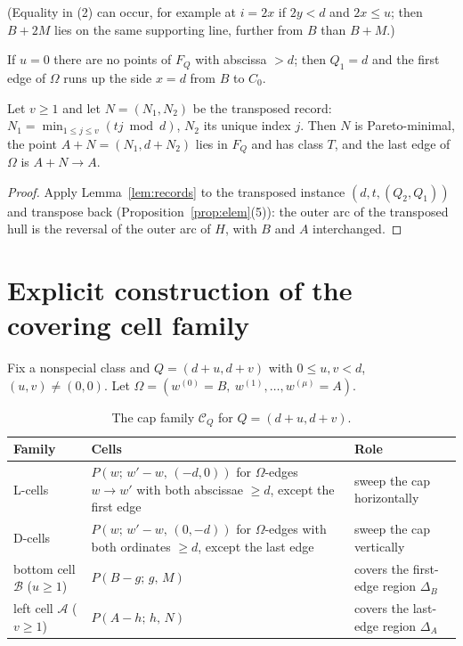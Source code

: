 (Equality in (2) can occur, for example at $i=2x$ if $2y<d$ and $2x\le u$; then $B+2M$ lies on the same supporting line, further from $B$ than $B+M$.)

If $u=0$ there are no points of $F_Q$ with abscissa $>d$; then $Q_1=d$ and the first edge of $\Omega$ runs up the side $x=d$ from $B$ to $C_0$.

\begin{lemma}\label{lem:last}
Let $v\ge1$ and let $N=(N_1,N_2)$ be the transposed record: $N_1=\min_{1\le j\le v}(tj\bmod d)$, $N_2$ its unique index $j$. Then $N$ is Pareto-minimal, the point $A+N=(N_1,d+N_2)$ lies in $F_Q$ and has class $T$, and the last edge of $\Omega$ is $A+N\to A$.
\end{lemma}
\begin{proof}
Apply Lemma~\ref{lem:records} to the transposed instance $(d,t,(Q_2,Q_1))$ and transpose back (Proposition~\ref{prop:elem}(5)): the outer arc of the transposed hull is the reversal of the outer arc of $H$, with $B$ and $A$ interchanged.
\end{proof}

\section{Explicit construction of the covering cell family}\label{sec:cellfamily}

Fix a nonspecial class and $Q=(d+u,d+v)$ with $0\le u,v<d$, $(u,v)\ne(0,0)$. Let $\Omega=(w^{(0)}=B,\ w^{(1)},\dots,w^{(\mu)}=A)$.

\begin{table}[ht]
\centering\small
\begin{tabular}{@{}p{3.2cm}p{7.2cm}p{4.2cm}@{}}
\toprule
Family & Cells & Role\\
\midrule
L-cells & $P(w;\,w'-w,\,(-d,0))$ for $\Omega$-edges $w\to w'$ with both abscissae $\ge d$, except the first edge & sweep the cap horizontally\\
D-cells & $P(w;\,w'-w,\,(0,-d))$ for $\Omega$-edges with both ordinates $\ge d$, except the last edge & sweep the cap vertically\\
bottom cell $\mathcal B$ ($u\ge1$) & $P(B-g;\,g,\,M)$ & covers the first-edge region $\Delta_B$\\
left cell $\mathcal A$ ($v\ge1$) & $P(A-h;\,h,\,N)$ & covers the last-edge region $\Delta_A$\\
\bottomrule
\end{tabular}
\caption{The cap family $\mathcal C_Q$ for $Q=(d+u,d+v)$.}\label{tab:capfamily}
\end{table}

